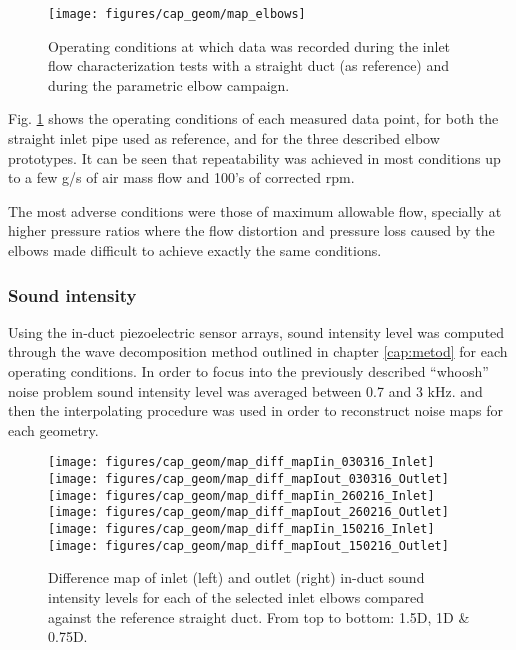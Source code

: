 \begin{figure}[bh!]
\centering
\texttt{[image: figures/cap\_geom/map\_elbows]}
\caption{Operating conditions at which data was recorded during the inlet flow characterization tests with a straight duct (as reference) and during the parametric elbow campaign.}
\label{fig:map_elbows}
\end{figure}

Fig. \ref{fig:map_elbows} shows the operating conditions of each measured data point, for both the straight inlet pipe used as reference, and for the three described elbow prototypes. It can be seen that repeatability was achieved in most conditions up to a few g/s of air mass flow and 100's of corrected rpm. 

The most adverse conditions were those of maximum allowable flow, specially at higher pressure ratios where the flow distortion and pressure loss caused by the elbows made difficult to achieve exactly the same conditions.

\subsubsection{Sound intensity}

Using the in-duct piezoelectric sensor arrays, sound intensity level was computed through the wave decomposition method outlined in chapter \ref{cap:metod} for each operating conditions. In order to focus into the previously described ``whoosh'' noise problem sound intensity level was averaged between 0.7 and 3 kHz. and then the interpolating procedure was used in order to reconstruct noise maps for each geometry.

\begin{figure}[thb!]
\centering

\texttt{[image: figures/cap\_geom/map\_diff\_mapIin\_030316\_Inlet]}\hspace{4mm}
\texttt{[image: figures/cap\_geom/map\_diff\_mapIout\_030316\_Outlet]}\\[4mm]

\texttt{[image: figures/cap\_geom/map\_diff\_mapIin\_260216\_Inlet]}\hspace{4mm}
\texttt{[image: figures/cap\_geom/map\_diff\_mapIout\_260216\_Outlet]}\\[4mm]

\texttt{[image: figures/cap\_geom/map\_diff\_mapIin\_150216\_Inlet]}\hspace{4mm}
\texttt{[image: figures/cap\_geom/map\_diff\_mapIout\_150216\_Outlet]}\\[4mm]

\caption{Difference map of inlet (left) and outlet (right) in-duct sound intensity levels for each of the selected inlet elbows compared against the reference straight duct. From top to bottom: 1.5D, 1D \& 0.75D.}
\label{fig:map_diff_in_out}
\end{figure}

